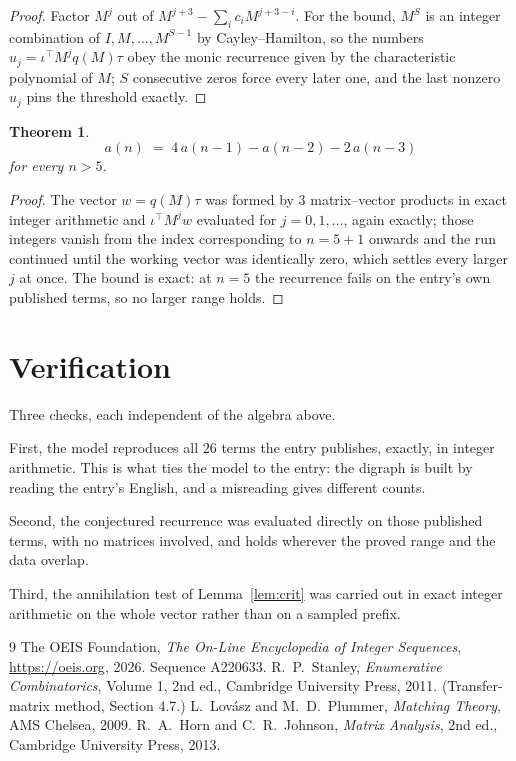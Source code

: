 \documentclass[11pt,a4paper]{article}
\theoremstyle{plain}
\newtheorem{theorem}{Theorem}
\theoremstyle{definition}
\begin{document}
\begin{proof}
Factor $M^{j}$ out of $M^{j+3}-\sum_ic_iM^{j+3-i}$. For the bound, $M^{S}$
is an integer combination of $I,M,\dots,M^{S-1}$ by Cayley--Hamilton, so the numbers
$u_j=\iota^{\!\top}M^{j}q(M)\tau$ obey the monic recurrence given by the characteristic
polynomial of $M$; $S$ consecutive zeros force every later one, and the last nonzero $u_j$
pins the threshold exactly.
\end{proof}

\begin{theorem}
\[
a(n)\;=\;4\,a(n-1) - a(n-2) - 2\,a(n-3)
\]
for every $n>5$.
\end{theorem}

\begin{proof}
The vector $w=q(M)\tau$ was formed by $3$ matrix--vector products in exact integer
arithmetic and $\iota^{\!\top}M^{j}w$ evaluated for $j=0,1,\dots$, again exactly; those
integers vanish from the index corresponding to $n=5+1$ onwards and the run continued
until the working vector was identically zero, which settles every larger $j$ at once. The bound is exact: at $n=5$ the recurrence fails on the entry's own published terms, so no larger range holds.
\end{proof}

\section{Verification}

Three checks, each independent of the algebra above.

First, the model reproduces all $26$ terms the entry publishes, exactly, in integer
arithmetic. This is what ties the model to the entry: the digraph is built by reading the
entry's English, and a misreading gives different counts.

Second, the conjectured recurrence was evaluated directly on those published terms, with no
matrices involved, and holds wherever the proved range and the data overlap.

Third, the annihilation test of Lemma~\ref{lem:crit} was carried out in exact integer
arithmetic on the whole vector rather than on a sampled prefix.

\begin{thebibliography}{9}
 The OEIS Foundation, \emph{The On-Line Encyclopedia of Integer
Sequences}, \url{https://oeis.org}, 2026. Sequence A220633.
 R.~P.~Stanley, \emph{Enumerative Combinatorics}, Volume 1, 2nd ed.,
Cambridge University Press, 2011. (Transfer-matrix method, Section 4.7.)
 L.~Lov\'asz and M.~D.~Plummer, \emph{Matching Theory}, AMS Chelsea,
2009.
 R.~A.~Horn and C.~R.~Johnson, \emph{Matrix Analysis}, 2nd ed., Cambridge
University Press, 2013.
\end{thebibliography}
\end{document}
